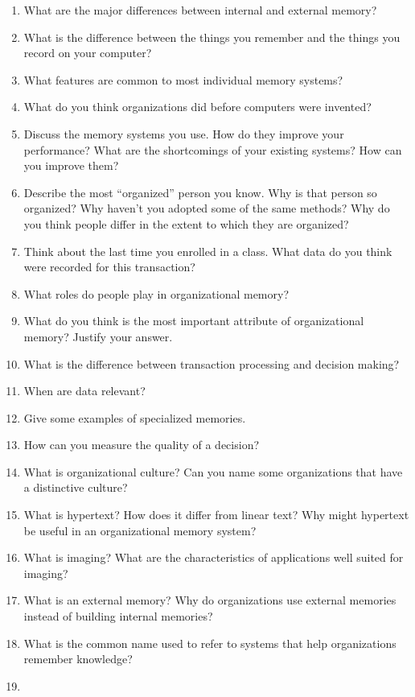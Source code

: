 \documentclass[
]{article}
\begin{document}
\begin{enumerate}
\def\labelenumi{\arabic{enumi}.}
\item
  What are the major differences between internal and external memory?
\item
  What is the difference between the things you remember and the
  things you record on your computer?
\item
  What features are common to most individual memory systems?
\item
  What do you think organizations did before computers were invented?
\item
  Discuss the memory systems you use. How do they improve your
  performance? What are the shortcomings of your existing systems? How
  can you improve them?
\item
  Describe the most ``organized'' person you know. Why is that person so
  organized? Why haven't you adopted some of the same methods? Why do
  you think people differ in the extent to which they are organized?
\item
  Think about the last time you enrolled in a class. What data do you
  think were recorded for this transaction?
\item
  What roles do people play in organizational memory?
\item
  What do you think is the most important attribute of organizational
  memory? Justify your answer.
\item
  What is the difference between transaction processing and decision
  making?
\item
  When are data relevant?
\item
  Give some examples of specialized memories.
\item
  How can you measure the quality of a decision?
\item
  What is organizational culture? Can you name some organizations that
  have a distinctive culture?
\item
  What is hypertext? How does it differ from linear text? Why might
  hypertext be useful in an organizational memory system?
\item
  What is imaging? What are the characteristics of applications well
  suited for imaging?
\item
  What is an external memory? Why do organizations use external
  memories instead of building internal memories?
\item
  What is the common name used to refer to systems that help
  organizations remember knowledge?
\item

\end{enumerate}
\end{document}
